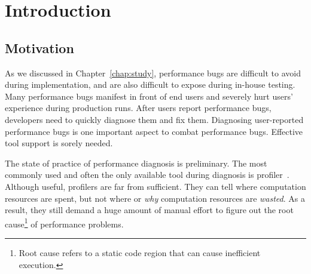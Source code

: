 \section{Introduction}

\subsection{Motivation}


As we discussed in Chapter~\ref{chap:study}, 
performance bugs are difficult to avoid during implementation, 
and are also difficult to expose during in-house testing. 
Many performance bugs manifest in front of end users 
and severely hurt users' experience during production runs. 
After users report performance bugs, 
developers need to quickly diagnose them and fix them. 
Diagnosing user-reported performance bugs is one important aspect to combat performance bugs. 
Effective tool support is sorely needed.

The state of practice of performance diagnosis is preliminary.
The most commonly used and often the only available tool during
diagnosis is profiler~\citep{oprofile,gprof}. 
Although useful, profilers are far from sufficient.
They can tell where
computation resources are spent, but not where or \textit{why} computation 
resources are 
\textit{wasted}.
As a result, they still demand a huge amount of manual effort to figure
out the root cause\footnote{Root cause refers to a static code
region that can cause inefficient execution.} of performance problems.


